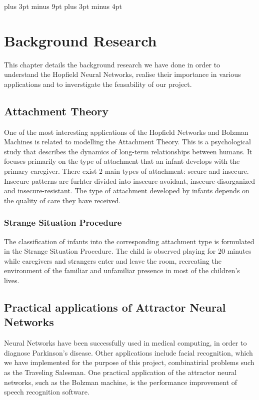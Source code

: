 \belowdisplayskip=12pt plus 3pt minus 9pt
\belowdisplayshortskip=7pt plus 3pt minus 4pt

\chapter{Background Research}
This chapter details the background research we have done in order to understand the Hopfield Neural Networks, realise their importance in various applications and to inverstigate the feasability of our project. 

\section{Attachment Theory}

One of the most interesting applications of the Hopfield Networks and Bolzman Machines is related to modelling the Attachment Theory. This is a psychological study that describes the dynamics of long-term relationships between humans\cite{website:attachment_theory_wiki}. It focuses primarily on the type of attachment that an infant develops with the primary caregiver. There exist 2 main types of attachment: secure and insecure. Insecure patterns are furhter divided into insecure-avoidant, insecure-disorganized and insecure-resistant. The type of attachment developed by infants depends on the quality of care they have received\cite{website:attachment_theory_wiki}.

\subsection{Strange Situation Procedure}

The classification of infants into the corresponding attachment type is formulated in the Strange Situation Procedure. The child is observed playing for 20 minutes while caregivers and strangers enter and leave the room, recreating the environment of the familiar and unfamiliar presence in most of the children's lives.\cite{website:attachment_patterns_wiki}

\section{Practical applications of Attractor Neural Networks}

Neural Networks have been successfully used in medical computing, in order to diagnose Parkinson's disease\cite{nets_parkinsons}. Other applications include facial recognition, which we have implemented for the purpose of this project, combinatirial problems such as the Traveling Salesman\cite{hopfield_laferriere}. 
One practical application of the attractor neural networks, such as the Bolzman machine, is the performance improvement of speech recognition software\cite{speech_nets}.

